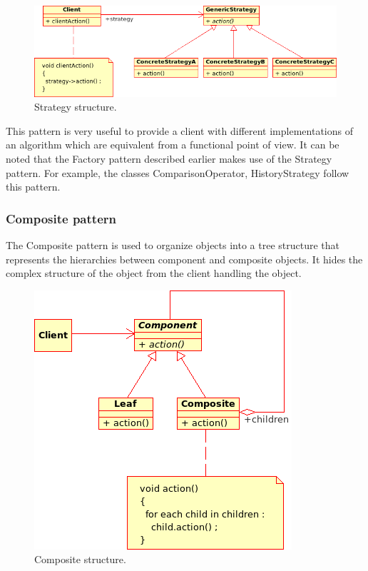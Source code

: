 \begin{figure}[htb]
\begin{center}
\includegraphics[scale=0.5]{Figures/modeling_notions/strategy.png}
\caption{Strategy structure.}\label{fig:strategy}
\end{center}
\end{figure}

This pattern is very useful to provide a client with different implementations of an algorithm which are equivalent from a functional point of view. It can be noted that the Factory pattern described earlier makes use of the Strategy pattern.
For example, the classes ComparisonOperator, HistoryStrategy follow this pattern.

\label{composite}\subsubsection{Composite pattern}

The Composite pattern is used to organize objects into a tree structure that represents the hierarchies between component and composite objects. It hides the complex structure of the object from the client handling the object.

\begin{figure}[htb]
\begin{center}
\includegraphics[scale=0.5]{Figures/modeling_notions/composite.png}
\caption{Composite structure.}\label{fig:composite}
\end{center}
\end{figure}

